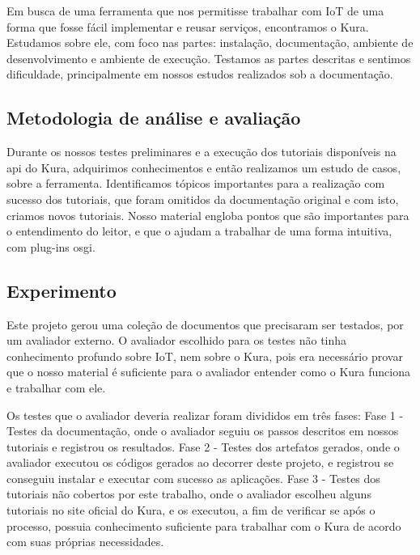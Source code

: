 
Em busca de uma ferramenta que nos permitisse trabalhar com IoT de uma forma que fosse fácil implementar e reusar serviços, encontramos o Kura. Estudamos sobre ele, com foco nas partes: instalação, documentação, ambiente de desenvolvimento e ambiente de execução. Testamos as partes descritas e sentimos dificuldade, principalmente em nossos estudos realizados sob a documentação.

\subsection{Metodologia de análise e avaliação}


Durante os nossos testes preliminares e a execução dos tutoriais disponíveis na api do Kura, adquirimos conhecimentos e então realizamos um estudo de casos, sobre a ferramenta. Identificamos tópicos importantes para a realização com sucesso dos tutoriais, que foram omitidos da documentação original e com isto, criamos novos tutoriais. Nosso material engloba pontos que são importantes para o entendimento do leitor, e que o ajudam a trabalhar de uma forma intuitiva, com plug-ins osgi.

\subsection{Experimento}


Este projeto gerou uma coleção de documentos que precisaram ser testados, por um avaliador externo. O avaliador escolhido para os testes não tinha conhecimento profundo sobre IoT, nem sobre o Kura, pois era necessário provar que o nosso material é suficiente para o avaliador entender como o Kura funciona e trabalhar com ele.

Os testes que o avaliador deveria realizar foram divididos em três fases: Fase 1 - Testes da documentação, onde o avaliador seguiu os passos descritos em nossos tutoriais e registrou os resultados. Fase 2 - Testes dos artefatos gerados, onde o avaliador executou os códigos gerados ao decorrer deste projeto, e registrou se conseguiu instalar e executar com sucesso as aplicações. Fase 3 - Testes dos tutoriais não cobertos por este trabalho, onde o avaliador escolheu alguns tutoriais no site oficial do Kura, e os executou, a fim de verificar se após o processo, possuia conhecimento suficiente para trabalhar com o Kura de acordo com suas próprias necessidades.


